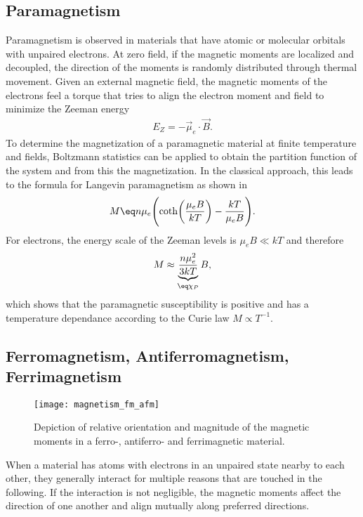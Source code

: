 \documentclass[\main/dresen_thesis.tex]{subfiles}
\begin{document}
  \subsection{Paramagnetism}\label{ch:theoreticalBackground:magnetism:paramagnetism}
    Paramagnetism is observed in materials that have atomic or molecular orbitals with unpaired electrons.
    At zero field, if the magnetic moments are localized and decoupled, the direction of the moments is randomly distributed through thermal movement.
    Given an external magnetic field, the magnetic moments of the electrons feel a torque that tries to align the electron moment and field to minimize the Zeeman energy
    \begin{align}
      E_Z = - \vec{\mu}_e \cdot \vec{B}.
    \end{align}
    To determine the magnetization of a paramagnetic material at finite temperature and fields, Boltzmann statistics can be applied to obtain the partition function of the system and from this the magnetization.
    In the classical approach, this leads to the formula for Langevin paramagnetism as shown in 
    \begin{align}
      M \eq n \mu_e \Biggl( \coth \biggl(\frac{\mu_e B}{k T} \biggr) - \frac{k T}{\mu_e B} \Biggr).
    \end{align}
    For electrons, the energy scale of the Zeeman levels is $\mu_e B \ll kT$ and therefore
    \begin{align}
      M \approx \underbrace{\frac{n \mu_e^2}{3kT}}_{\eq \chi_P} B,
    \end{align}
    which shows that the paramagnetic susceptibility is positive and has a temperature dependance according to the Curie law $M \propto T^{-1}$.

  \subsection{Ferromagnetism, Antiferromagnetism, Ferrimagnetism}
    \begin{figure}[tb]
      \centering
      \texttt{[image: magnetism\_fm\_afm]}
      \caption{\label{fig:theoreticalBackground:magnetism:fm_afm_fim}Depiction of relative orientation and magnitude of the magnetic moments in a ferro-, antiferro- and ferrimagnetic material.}
    \end{figure}

    When a material has atoms with electrons in an unpaired state nearby to each other, they generally interact for multiple reasons that are touched in the following.
    If the interaction is not negligible, the magnetic moments affect the direction of one another and align mutually along preferred directions.
\end{document}
